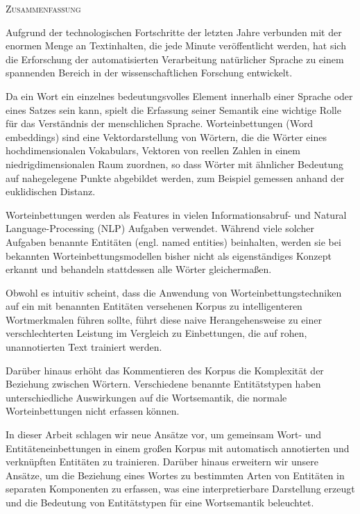 \begin{center}
  \textsc{Zusammenfassung}
\end{center}
\noindent

Aufgrund der technologischen Fortschritte der letzten Jahre verbunden mit der enormen Menge an Textinhalten, die jede Minute veröffentlicht werden, hat sich die  Erforschung der automatisierten Verarbeitung natürlicher Sprache zu einem spannenden Bereich in der wissenschaftlichen Forschung entwickelt.

Da ein Wort ein einzelnes bedeutungsvolles Element innerhalb einer Sprache oder eines Satzes sein kann, spielt die Erfassung seiner Semantik eine wichtige Rolle für das Verständnis der menschlichen Sprache.
Worteinbettungen (Word embeddings) sind eine Vektordarstellung von Wörtern, die die Wörter eines hochdimensionalen Vokabulars, Vektoren von reellen Zahlen in einem niedrigdimensionalen Raum zuordnen, so dass Wörter mit ähnlicher Bedeutung auf nahegelegene Punkte abgebildet werden, zum Beispiel gemessen anhand der euklidischen Distanz.

Worteinbettungen werden als Features in vielen Informationsabruf- und Natural Language-Processing (NLP) Aufgaben verwendet. Während viele solcher Aufgaben benannte Entitäten (engl. named entities) beinhalten, werden sie bei bekannten Worteinbettungsmodellen bisher nicht als eigenständiges Konzept erkannt und behandeln stattdessen alle Wörter gleichermaßen.

Obwohl es intuitiv scheint, dass die Anwendung von Worteinbettungstechniken auf ein mit benannten Entitäten versehenen Korpus zu intelligenteren Wortmerkmalen führen sollte, führt diese naive Herangehensweise zu einer verschlechterten Leistung im Vergleich zu Einbettungen, die auf rohen, unannotierten Text trainiert werden.

Darüber hinaus erhöht das Kommentieren des Korpus die Komplexität der Beziehung zwischen Wörtern. Verschiedene benannte Entitätstypen haben unterschiedliche Auswirkungen auf die Wortsemantik, die normale Worteinbettungen nicht erfassen können.

In dieser Arbeit schlagen wir neue Ansätze vor, um gemeinsam Wort- und Entitäteneinbettungen in einem großen Korpus mit automatisch annotierten und verknüpften Entitäten zu trainieren.
Darüber hinaus erweitern wir unsere Ansätze, um die Beziehung eines Wortes zu bestimmten Arten von Entitäten in separaten Komponenten zu erfassen, was eine interpretierbare Darstellung erzeugt und die Bedeutung von Entitätstypen für eine Wortsemantik beleuchtet.

